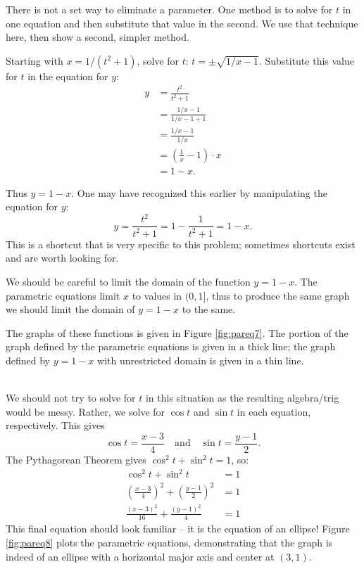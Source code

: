 {There is not a set way to eliminate a parameter. One method is to solve for $t$ in one equation and then substitute that value in the second. We use that technique here, then show a second, simpler method.

Starting with $x= 1/(t^2+1)$, solve for $t$: $ t = \pm\sqrt{1/x-1}$. Substitute this value for $t$ in the equation for $y$:
\begin{align*}
 y &= \frac{t^2}{t^2 +1} \\
		&= \frac{1/x-1}{1/x-1+1} \\
		&= \frac{1/x - 1}{1/x} \\
		&= \left(\frac1x-1\right)\cdot x \\
		&= 1-x.
\end{align*}

Thus $y=1-x$. One may have recognized this earlier by manipulating the equation for $y$:
$$y = \frac{t^2}{t^2+1} = 1-\frac{1}{t^2+1} = 1-x.$$ This is a shortcut that is very specific to this problem; sometimes shortcuts exist and are worth looking for.

We should be careful to limit the domain of the function $y=1-x$. The parametric equations limit $x$ to values in $(0,1]$, thus to produce the same graph we should limit the domain of $y=1-x$ to the same. 

The graphs of these functions is given in Figure \ref{fig:pareq7}. The portion of the graph defined by the parametric equations is given in a thick line; the graph defined by $y=1-x$ with unrestricted domain is given in a thin line.
}\\

{We should not try to solve for $t$ in this situation as the resulting algebra/trig would be messy. Rather, we solve for $\cos t$ and $\sin t$ in each equation, respectively. This gives $$\cos t = \frac{x-3}{4} \quad \text{and}\quad \sin t=\frac{y-1}{2}.$$
The Pythagorean Theorem gives $\cos^2t+\sin^2t=1$, so:
\begin{align*}
\cos^2t+\sin^2t &=1 \\
\left(\frac{x-3}{4}\right)^2 +\left(\frac{y-1}{2}\right)^2 &=1\\
\frac{(x-3)^2}{16}+\frac{(y-1)^2}{4} &=1
\end{align*}
This final equation should look familiar -- it is the equation of an ellipse! Figure \ref{fig:pareq8} plots the parametric equations, demonstrating that the graph is indeed of an ellipse with a horizontal major axis and center at $(3,1)$. 
}\\

